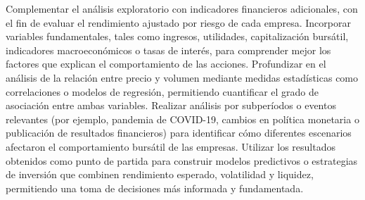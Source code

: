 Complementar el análisis exploratorio con indicadores financieros adicionales, con el fin de evaluar el rendimiento ajustado por riesgo de cada empresa.
Incorporar variables fundamentales, tales como ingresos, utilidades, capitalización bursátil, indicadores macroeconómicos o tasas de interés, para comprender mejor los factores que explican el comportamiento de las acciones.
Profundizar en el análisis de la relación entre precio y volumen mediante medidas estadísticas como correlaciones o modelos de regresión, permitiendo cuantificar el grado de asociación entre ambas variables.
Realizar análisis por subperíodos o eventos relevantes (por ejemplo, pandemia de COVID-19, cambios en política monetaria o publicación de resultados financieros) para identificar cómo diferentes escenarios afectaron el comportamiento bursátil de las empresas.
Utilizar los resultados obtenidos como punto de partida para construir modelos predictivos o estrategias de inversión que combinen rendimiento esperado, volatilidad y liquidez, permitiendo una toma de decisiones más informada y fundamentada.